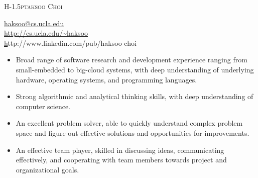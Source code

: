 \documentclass[12pt,letterpaper]{article}
\makeatletter
\def\myemail{haksoo@cs.ucla.edu}
\def\myweb{http://cs.ucla.edu/~haksoo}
\def\mylinkedin{http://www.linkedin.com/pub/haksoo-choi}
\def\myvspace{\vspace{-0.22in}}
\newcommand{\mhead}[1]{\leavevmode\marginpar{\sffamily\footnotesize #1}}
\makeatother
\begin{document}
\flushbottom
\pagestyle{fancy} \setlength\headwidth{6.5in}
 \cfoot{}
\thispagestyle{empty}
\begin{adjustwidth}{-1in}{}
{\Huge
  {\textsc{%
    {H}\kern-1.5ptaksoo 
    {C}hoi}
  }
}
\hfill\hfill\hfill
{
  \begin{minipage}[b]{1.6in}
  \end{minipage}
  \hfill
  \begin{minipage}[b]{2.5in}
    \flushright \footnotesize 
    \href{mailto:\myemail}{\myemail} \\
    \href{\myweb}{http://cs.ucla.edu/\textasciitilde haksoo} \\
    \href{\mylinkedin}\mylinkedin \\
  \end{minipage}
}\par
\hrulefill
\end{adjustwidth}  
\reversemarginpar 
\setlength\marginparwidth{0.85in}
\medskip
\mhead{Summary}%
\myvspace
\begin{itemize}
\item Broad range of software research and development experience ranging from small-embedded to big-cloud systems, with deep understanding of underlying hardware, operating systems, and programming
languages.
\item Strong algorithmic and analytical thinking skills, with deep understanding of computer science.
\item An excellent problem solver, able to quickly understand complex problem space and figure out effective solutions and opportunities for improvements.
\item An effective team player, skilled in discussing ideas, communicating effectively, and cooperating with team members towards project and organizational goals.
\end{itemize}
\end{document}
